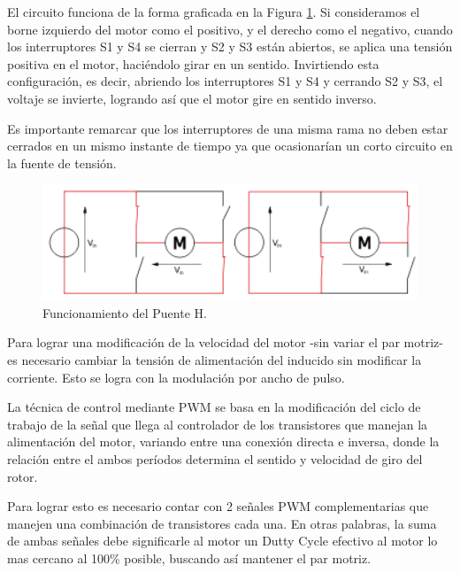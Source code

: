 \documentclass[11pt, a4paper]{article}
\begin{document}
El circuito funciona de la forma graficada en la Figura \ref{fig:puenteH_operacion}. Si consideramos el borne izquierdo del motor como el positivo, y el derecho como el negativo, cuando los interruptores S1 y S4 se cierran y S2 y S3 están abiertos, se aplica una tensión positiva en el motor, haciéndolo girar en un sentido. Invirtiendo esta configuración, es decir, abriendo los interruptores S1 y S4 y cerrando S2 y S3, el voltaje se invierte, logrando así que el motor gire en sentido inverso. 

Es importante remarcar que los interruptores de una misma rama no deben estar cerrados en un mismo instante de tiempo ya que ocasionarían un
corto circuito en la fuente de tensión. 

\begin{figure}[h]
	\centering
	\includegraphics[width=13cm]{Imagenes/puenteH_operacion}
	\caption{Funcionamiento del Puente H.}
	\label{fig:puenteH_operacion}
\end{figure} 

Para lograr una modificación de la velocidad del motor -sin variar el par motriz- es necesario cambiar la tensión de alimentación del inducido sin modificar la corriente. Esto se logra con la modulación por ancho de pulso. 

La técnica de control mediante PWM se basa en la modificación del ciclo de trabajo de la señal que llega al controlador de los transistores que manejan la alimentación del motor, variando entre una conexión directa e inversa, donde la relación entre el ambos períodos determina el sentido y velocidad de giro del rotor.

Para lograr esto es necesario contar con 2 señales PWM complementarias que manejen una combinación de transistores cada una. En otras palabras, la suma de ambas señales debe significarle al motor un Dutty Cycle efectivo al motor lo mas cercano al 100\% posible, buscando así mantener el par motriz.
\end{document}
